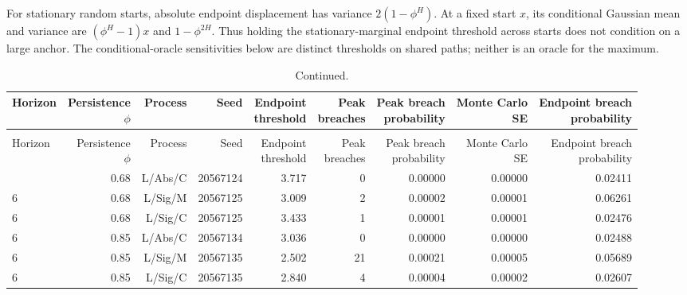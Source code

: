 \documentclass[11pt,a4paper]{article}
\begin{document}
For stationary random starts, absolute endpoint displacement has
variance \(2(1-\phi^H)\). At a fixed start \(x\), its conditional Gaussian
mean and variance are \((\phi^H-1)x\) and \(1-\phi^{2H}\). Thus holding the
stationary-marginal endpoint threshold across starts does not condition on a
large anchor. The conditional-oracle sensitivities below are distinct thresholds
on shared paths; neither is an oracle for the maximum.
\begingroup
\scriptsize
\setlength{\tabcolsep}{3pt}
\renewcommand{\arraystretch}{1.12}
\begin{longtable}{lrrrrrrrr}
\caption{All secondary anchor and conditional-threshold sensitivities. Conditional and marginal endpoint calibration remain distinct.}\\
\toprule
Horizon & \shortstack{Persistence\\\(\phi\)} & Process & Seed & \shortstack{Endpoint\\threshold} & \shortstack{Peak\\breaches} & \shortstack{Peak breach\\probability} & \shortstack{Monte Carlo\\SE} & \shortstack{Endpoint breach\\probability} \\
\midrule
\endfirsthead
\caption[]{Continued.}\\
\toprule
Horizon & \shortstack{Persistence\\\(\phi\)} & Process & Seed & \shortstack{Endpoint\\threshold} & \shortstack{Peak\\breaches} & \shortstack{Peak breach\\probability} & \shortstack{Monte Carlo\\SE} & \shortstack{Endpoint breach\\probability} \\
\midrule
\endhead
\bottomrule
\endfoot
6 & 0.68 & L/Abs/C & 20567124 & 3.717 & 0 & 0.00000 & 0.00000 & 0.02411 \\
6 & 0.68 & L/Sig/M & 20567125 & 3.009 & 2 & 0.00002 & 0.00001 & 0.06261 \\
6 & 0.68 & L/Sig/C & 20567125 & 3.433 & 1 & 0.00001 & 0.00001 & 0.02476 \\
6 & 0.85 & L/Abs/C & 20567134 & 3.036 & 0 & 0.00000 & 0.00000 & 0.02488 \\
6 & 0.85 & L/Sig/M & 20567135 & 2.502 & 21 & 0.00021 & 0.00005 & 0.05689 \\
6 & 0.85 & L/Sig/C & 20567135 & 2.840 & 4 & 0.00004 & 0.00002 & 0.02607 \\

\end{longtable}
\end{document}
